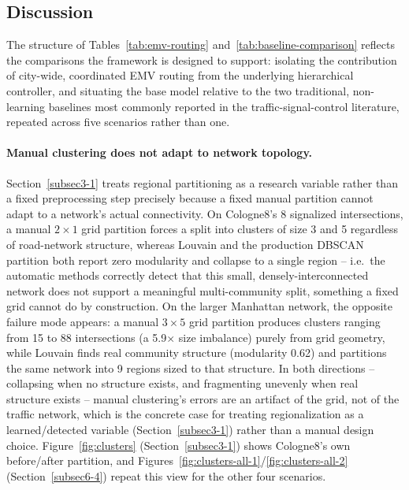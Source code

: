\documentclass[3p,times]{elsarticle}
\theoremstyle{plain}
\theoremstyle{definition}
\begin{document}
\subsection{Discussion}\label{subsec6-3}

The structure of Tables~\ref{tab:emv-routing}
and~\ref{tab:baseline-comparison} reflects the comparisons the
framework is designed to support: isolating the contribution of
city-wide, coordinated EMV routing from the underlying hierarchical
controller, and situating the base model relative to the two
traditional, non-learning baselines most commonly reported in the
traffic-signal-control literature, repeated across five scenarios
rather than one.

\paragraph{Manual clustering does not adapt to network topology.}
Section~\ref{subsec3-1} treats regional partitioning as a research
variable rather than a fixed preprocessing step precisely because a
fixed manual partition cannot adapt to a network's actual connectivity.
On Cologne8's 8 signalized intersections, a manual $2\times1$ grid
partition forces a split into clusters of size 3 and 5 regardless of
road-network structure, whereas Louvain and the production DBSCAN
partition both report zero modularity and collapse to a single region
-- i.e.\ the automatic methods correctly detect that this small,
densely-interconnected network does not support a meaningful
multi-community split, something a fixed grid cannot do by
construction. On the larger Manhattan network, the opposite failure
mode appears: a manual $3\times5$ grid partition produces clusters
ranging from 15 to 88 intersections (a 5.9$\times$ size imbalance)
purely from grid geometry, while Louvain finds real community
structure (modularity 0.62) and partitions the same network into 9
regions sized to that structure. In both directions -- collapsing
when no structure exists, and fragmenting unevenly when real structure
exists -- manual clustering's errors are an artifact of the grid, not
of the traffic network, which is the concrete case for treating
regionalization as a learned/detected variable (Section~\ref{subsec3-1})
rather than a manual design choice. Figure~\ref{fig:clusters}
(Section~\ref{subsec3-1}) shows Cologne8's own before/after partition,
and Figures~\ref{fig:clusters-all-1}/\ref{fig:clusters-all-2}
(Section~\ref{subsec6-4}) repeat this view for the other four
scenarios.
\end{document}
